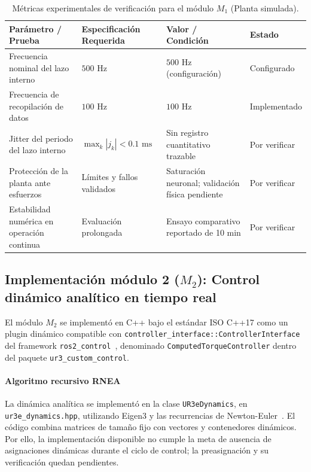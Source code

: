 \documentclass[12pt]{article}
\begin{document}
\begin{table}[htbp]
\centering
\small
\caption{Métricas experimentales de verificación para el módulo $M_1$ (Planta simulada).}
\label{tab:verificacion_m1}
\begin{tabularx}{\textwidth}{>{\raggedright\arraybackslash}X >{\centering\arraybackslash}p{4.2cm} >{\centering\arraybackslash}p{3.2cm} >{\centering\arraybackslash}p{2.2cm}}
\toprule
\textbf{Parámetro / Prueba} & \textbf{Especificación Requerida} & \textbf{Valor / Condición} & \textbf{Estado} \\
\midrule
Frecuencia nominal del lazo interno & $500\text{ Hz}$ & $500\text{ Hz}$ (configuración) & Configurado \\
Frecuencia de recopilación de datos & $100\text{ Hz}$ & $100\text{ Hz}$ & Implementado \\
Jitter del periodo del lazo interno & $\max_k |j_k| < 0.1\text{ ms}$ & Sin registro cuantitativo trazable & Por verificar \\
Protección de la planta ante esfuerzos & Límites y fallos validados & Saturación neuronal; validación física pendiente & Por verificar \\
Estabilidad numérica en operación continua & Evaluación prolongada & Ensayo comparativo reportado de 10 min & Por verificar \\
\bottomrule
\end{tabularx}
\end{table}


\subsection{Implementación módulo 2 ($M_2$): Control dinámico analítico en tiempo real}
\label{sec:imp_m2}

El módulo $M_2$ se implementó en C++ bajo el estándar ISO C++17 como un plugin dinámico compatible con \texttt{controller\_interface::ControllerInterface} del framework \texttt{ros2\_control}~\cite{macenski2022robot}, denominado \texttt{ComputedTorqueController} dentro del paquete \texttt{ur3\_custom\_control}.

\paragraph{Algoritmo recursivo RNEA}
La dinámica analítica se implementó en la clase \texttt{UR3eDynamics}, en \texttt{ur3e\_dynamics.hpp}, utilizando Eigen3 y las recurrencias de Newton-Euler~\cite{luh1980online, spong2006robot}. El código combina matrices de tamaño fijo con vectores y contenedores dinámicos. Por ello, la implementación disponible no cumple la meta de ausencia de asignaciones dinámicas durante el ciclo de control; la preasignación y su verificación quedan pendientes.
\end{document}
